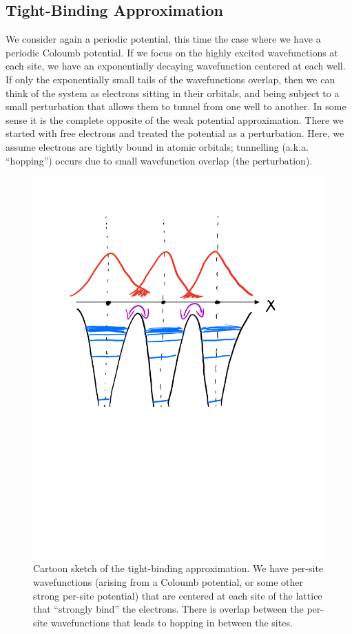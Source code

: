\subsection{Tight-Binding Approximation}
We consider again a periodic potential, this time the case where we have a periodic Coloumb potential. If we focus on the highly excited wavefunctions at each site, we have an exponentially decaying wavefunction centered at each well. If only the exponentially small tails of the wavefunctions overlap, then we can think of the system as electrons sitting in their orbitals, and being subject to a small perturbation that allows them to tunnel from one well to another. In some sense it is the complete opposite of the weak potential approximation. There we started with free electrons and treated the potential as a perturbation. Here, we assume electrons are tightly bound in atomic orbitals; tunnelling (a.k.a. ``hopping'') occurs due to small wavefunction overlap (the perturbation). 

\begin{figure}[htbp]
    \centering
    \includegraphics[scale=0.5]{Images/fig-tightbindingcartoon.pdf}

    \caption{Cartoon sketch of the tight-binding approximation. We have per-site wavefunctions (arising from a Coloumb potential, or some other strong per-site potential) that are centered at each site of the lattice that ``strongly bind'' the electrons. There is overlap between the per-site wavefunctions that leads to hopping in between the sites.}
    \label{fig-tightbindingcartoon}
\end{figure}

